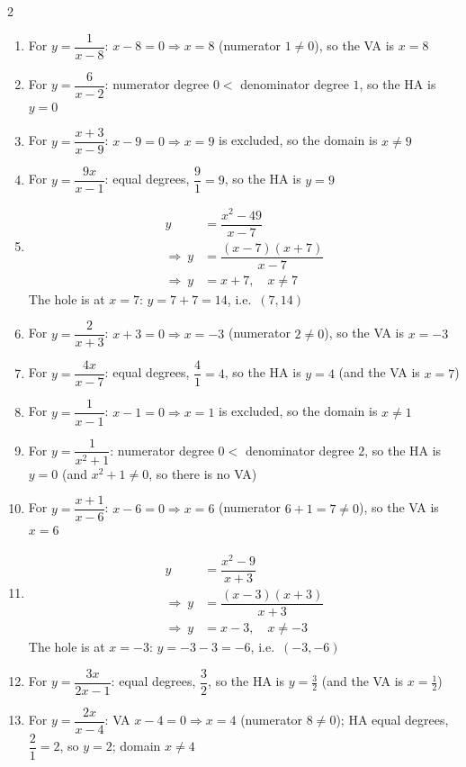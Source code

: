 \documentclass[11pt]{article}
\begin{document}
\begin{keybox}
\begin{multicols}{2}
\small
\begin{enumerate}[leftmargin=*,itemsep=3pt]
  \item For $y=\dfrac{1}{x-8}$: $x-8=0\Rightarrow x=8$ (numerator $1\ne0$), so the VA is $x=8$
  \item For $y=\dfrac{6}{x-2}$: numerator degree $0<$ denominator degree $1$, so the HA is $y=0$
  \item For $y=\dfrac{x+3}{x-9}$: $x-9=0\Rightarrow x=9$ is excluded, so the domain is $x\ne9$
  \item For $y=\dfrac{9x}{x-1}$: equal degrees, $\dfrac91=9$, so the HA is $y=9$
  \item \[\begin{aligned}y&=\dfrac{x^2-49}{x-7}\\\Rightarrow\ y&=\dfrac{(x-7)(x+7)}{x-7}\\\Rightarrow\ y&=x+7,\quad x\ne7\end{aligned}\]The hole is at $x=7$: $y=7+7=14$, i.e.\ $(7,14)$
  \item For $y=\dfrac{2}{x+3}$: $x+3=0\Rightarrow x=-3$ (numerator $2\ne0$), so the VA is $x=-3$
  \item For $y=\dfrac{4x}{x-7}$: equal degrees, $\dfrac41=4$, so the HA is $y=4$ (and the VA is $x=7$)
  \item For $y=\dfrac{1}{x-1}$: $x-1=0\Rightarrow x=1$ is excluded, so the domain is $x\ne1$
  \item For $y=\dfrac{1}{x^2+1}$: numerator degree $0<$ denominator degree $2$, so the HA is $y=0$ (and $x^2+1\ne0$, so there is no VA)
  \item For $y=\dfrac{x+1}{x-6}$: $x-6=0\Rightarrow x=6$ (numerator $6+1=7\ne0$), so the VA is $x=6$
  \item \[\begin{aligned}y&=\dfrac{x^2-9}{x+3}\\\Rightarrow\ y&=\dfrac{(x-3)(x+3)}{x+3}\\\Rightarrow\ y&=x-3,\quad x\ne-3\end{aligned}\]The hole is at $x=-3$: $y=-3-3=-6$, i.e.\ $(-3,-6)$
  \item For $y=\dfrac{3x}{2x-1}$: equal degrees, $\dfrac32$, so the HA is $y=\tfrac32$ (and the VA is $x=\tfrac12$)
  \item For $y=\dfrac{2x}{x-4}$: VA $x-4=0\Rightarrow x=4$ (numerator $8\ne0$); HA equal degrees, $\dfrac21=2$, so $y=2$; domain $x\ne4$
\end{enumerate}
\end{multicols}
\end{keybox}
\end{document}
